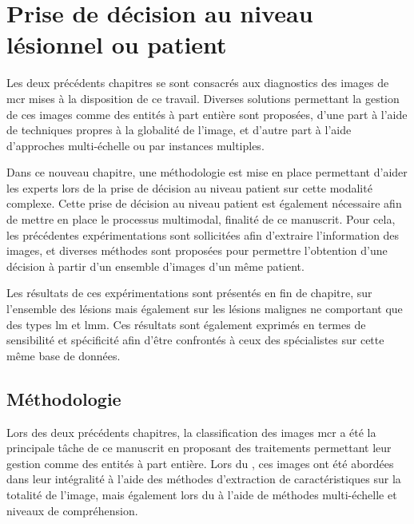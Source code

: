 \renewcommand{\thechapter}{\arabic{chapter}}
\setcounter{chapter}{6}

\chapter{Prise de décision au niveau lésionnel ou patient}
\label{chap:chapter_7}
\chapterintro
Les deux précédents chapitres se sont consacrés aux diagnostics des images de \acrlong {mcr} mises à la disposition de ce travail. Diverses solutions permettant la gestion de ces images comme des entités à part entière sont proposées, d'une part à l'aide de techniques propres à la globalité de l'image, et d'autre part à l'aide d'approches multi-échelle ou par instances multiples.\par

Dans ce nouveau chapitre, une méthodologie est mise en place permettant d'aider les experts lors de la prise de décision au niveau patient sur cette modalité complexe. Cette prise de décision au niveau patient est également nécessaire afin de mettre en place le processus multimodal, finalité de ce manuscrit. Pour cela, les précédentes expérimentations sont sollicitées afin d'extraire l'information des images, et diverses méthodes sont proposées pour permettre l'obtention d'une décision à partir d'un ensemble d'images d'un même patient.\par

Les résultats de ces expérimentations sont présentés en fin de chapitre, sur l'ensemble des lésions mais également sur les lésions malignes ne comportant que des types \acrlong{lm} et \acrlong{lmm}. Ces résultats sont également exprimés en termes de sensibilité et spécificité afin d'être confrontés à ceux des spécialistes sur cette même base de données.\par
\newpage

\section{Méthodologie}
\label{sec:patient_decision_methodology}
Lors des deux précédents chapitres, la classification des images \gls{mcr} a été la principale tâche de ce manuscrit en proposant des traitements permettant leur gestion comme des entités à part entière. Lors du , ces images ont été abordées dans leur intégralité à l'aide des méthodes d'extraction de caractéristiques sur la totalité de l'image, mais également lors du  à l'aide de méthodes multi-échelle et niveaux de compréhension.\par

